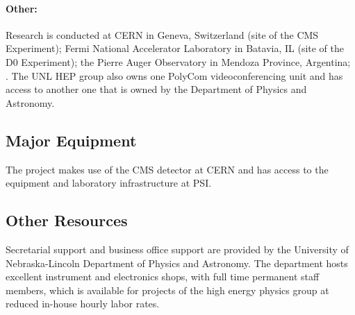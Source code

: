 \paragraph{Other:} Research is conducted at CERN in Geneva, Switzerland (site of
the CMS Experiment); Fermi National Accelerator Laboratory in Batavia, IL
(site of the D0 Experiment); the Pierre Auger Observatory in Mendoza
Province, Argentina; .  The UNL
HEP group also owns one PolyCom videoconferencing unit and has access to
another one that is owned by the Department of Physics and Astronomy.

\subsection{Major Equipment}
The project makes use of the CMS detector at CERN and has access to the equipment and laboratory infrastructure at PSI.

\subsection{Other Resources}
Secretarial support and business office support are provided by the
University of Nebraska-Lincoln Department of Physics and Astronomy. The
department hosts excellent instrument and electronics shops, with full time
permanent staff members, which is available for projects of the high energy
physics group at reduced in-house hourly labor rates.

